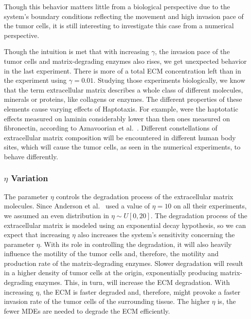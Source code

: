Though this behavior matters little from a biological perspective due to the system's boundary conditions reflecting the movement and high invasion pace of the tumor cells, it is still interesting to investigate this case from a numerical perspective.

Though the intuition is met that with increasing $\gamma$, the invasion pace of the tumor cells and matrix-degrading enzymes also rises, we get unexpected behavior in the last experiment. There is more of a total ECM concentration left than in the experiment using $\gamma=0.01$.
Studying those experiments biologically, we know that the term extracellular matrix describes a whole class of different molecules, minerals or proteins, like collagens or enzymes. The different properties of these elements cause varying effects of Haptotaxis. For example, were the haptotatic effects measured on laminin considerably lower than then ones measured on fibronectin, according to Aznavoorian et al.~\cite{article}. Different constellations of extracellular matrix composition will be encountered in different human body sites, which will cause the tumor cells, as seen in the numerical experiments, to behave differently.

\subsubsection*{$\eta$ Variation}
The parameter $\eta$ controls the degradation process of the extracellular matrix molecules. Since Anderson et al.~\cite{anderson_mathematical_2000} used a value of $\eta=10$ on all their experiments, we assumed an even distribution in $\eta \sim U[0, 20]$. The degradation process of the extracellular matrix is modeled using an exponential decay hypothesis, so we can expect that increasing $\eta$ also increases the system's sensitivity concerning the parameter $\eta$. With its role in controlling the degradation, it will also heavily influence the motility of the tumor cells and, therefore, the motility and production rate of the matrix-degrading enzymes. Slower degradation will result in a higher density of tumor cells at the origin, exponentially producing matrix-degrading enzymes. This, in turn, will increase the ECM degradation. With increasing $\eta$, the ECM is faster degraded and, therefore, might provoke a faster invasion rate of the tumor cells of the surrounding tissue. The higher $\eta$ is, the fewer MDEs are needed to degrade the ECM efficiently.

